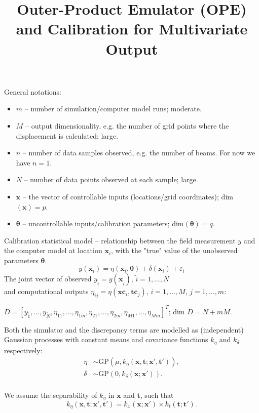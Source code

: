 \documentclass[a4paper,12pt]{article}
\title{Outer-Product Emulator (OPE) and Calibration for Multivariate Output}
\newcommand{\bmx}{\bm{x}}
\newcommand{\bmxf}{\bm{x}}
\newcommand{\bmxc}{\bm{xc}}
\newcommand{\bmtheta}{\bm{\theta}}
\newcommand{\bmt}{\bm{t}}
\newcommand{\bmtc}{\bm{tc}}
\begin{document}
\maketitle
General notations:
\begin{itemize}
	\item $m$ -- number of simulation/computer model runs; moderate.
	\item $M$ -- output dimensionality, e.g. the number of grid points where the displacement is calculated; large.
	\item $n$ -- number of data samples observed, e.g. the number of beams. For now we have $n=1$.
	\item $N$ -- number of data points observed at each sample; large.
	\item $\bmx$ -- the vector of controllable inputs (locations/grid coordinates); dim$(\bmx) = p$. 
	\item $\bmtheta$ -- uncontrollable inputs/calibration parameters; dim$(\bmtheta) = q$. 
\end{itemize}
Calibration statistical model -- relationship between the field measurement $y$ and the computer model at location $\bmx_{i}$, with the "true" value of the unobserved parameters $\bmtheta$.
\begin{equation}
\label{eq::stat_calibration_model}
y(\bmx_i) = \eta(\bmx_i, \bmtheta) + \delta(\bmx_i) + \varepsilon_i
\end{equation}
The joint vector of observed $y_{\tilde{i}} = y(\bmxf_{\tilde{i}})$, $\tilde{i}= 1,\dots ,N$ \\and computational outputs $\eta_{ij} = \eta(\bmxc_i, \bmtc_j)$, $i = 1,\dots , M$, $j = 1,\dots , m$:
\begin{center}
$D = [y_{\tilde{1}},\dots , y_{\tilde{N}}, \eta_{11}, \dots ,\eta_{1m}, \eta_{21}, \dots ,\eta_{2m}, \eta_{M1}, \dots ,\eta_{Mm}]^T$; dim $D = N + mM$.
\end{center}
Both the simulator and the discrepancy terms are modelled as (independent) Gaussian processes with constant means and covariance functions $k_{\eta}$ and $k_{\delta}$ respectively:
\begin{align*}
\eta  &\sim \mbox{GP}(\mu, k_{\eta}(\bmx, \bmt; \bmx', \bmt' )),\\
\delta  &\sim \mbox{GP}(0, k_{\delta}(\bmx; \bmx')).\\
\end{align*}

We assume the separability of $k_{\eta}$ in $\bmx$ and $\bmt$, such that
\begin{equation*}
k_{\eta}(\bmx, \bmt; \bmx', \bmt' ) = k_{x}(\bmx; \bmx')\times k_{t}(\bmt; \bmt').
\end{equation*}
\end{document}
